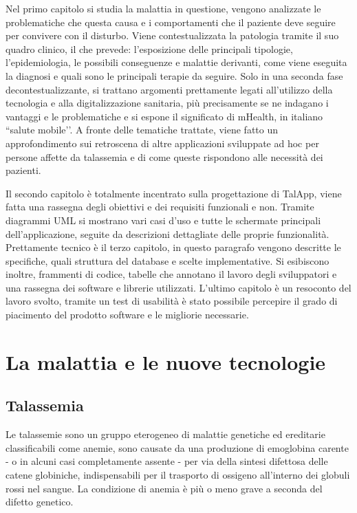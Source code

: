 \documentclass[12pt,a4paper,openright,twoside]{report}
\begin{document}
Nel primo capitolo si studia la malattia in questione, vengono analizzate le problematiche che questa causa e i comportamenti che il paziente deve seguire per convivere con il disturbo. Viene contestualizzata la patologia tramite il suo quadro clinico, il che prevede: l’esposizione delle principali tipologie, l’epidemiologia, le possibili conseguenze e malattie derivanti, come viene eseguita la diagnosi e quali sono le principali terapie da seguire. Solo in una seconda fase decontestualizzante, si trattano argomenti prettamente legati all’utilizzo della tecnologia e alla digitalizzazione sanitaria, più precisamente se ne indagano i vantaggi e le problematiche e si espone il significato di mHealth, in italiano ``salute mobile’’. A fronte delle tematiche trattate, viene fatto un approfondimento sui retroscena di altre applicazioni sviluppate ad hoc per persone affette da talassemia e di come queste rispondono alle necessità dei pazienti.

Il secondo capitolo è totalmente incentrato sulla progettazione di TalApp, viene fatta una rassegna degli obiettivi e dei requisiti funzionali e non. Tramite diagrammi UML si mostrano vari casi d’uso e tutte le schermate principali dell’applicazione, seguite da descrizioni dettagliate delle proprie funzionalità. \\
Prettamente tecnico è il terzo capitolo, in questo paragrafo vengono descritte le specifiche, quali struttura del database e scelte implementative. Si esibiscono inoltre, frammenti di codice, tabelle che annotano il lavoro degli sviluppatori e una rassegna dei software e librerie utilizzati.
L’ultimo capitolo è un resoconto del lavoro svolto, tramite un test di usabilità è stato possibile percepire il grado di piacimento del prodotto software e le migliorie necessarie.

\clearpage{\pagestyle{empty}\cleardoublepage}


\chapter{La malattia e le nuove tecnologie}     
\rhead[\fancyplain{}{\bfseries\leftmark}]{\fancyplain{}{\bfseries\thepage}}
\lhead[\fancyplain{}{\bfseries\thepage}]{\fancyplain{}{\bfseries\leftmark}}

\section{Talassemia}            
Le talassemie sono un gruppo eterogeneo di malattie genetiche ed ereditarie classificabili come anemie, sono causate da una produzione di emoglobina carente - o in alcuni casi completamente assente - per via della sintesi difettosa delle catene globiniche, indispensabili per il trasporto di ossigeno all'interno dei globuli rossi nel sangue. La condizione di anemia è più o meno grave a seconda del difetto genetico.
\end{document}
